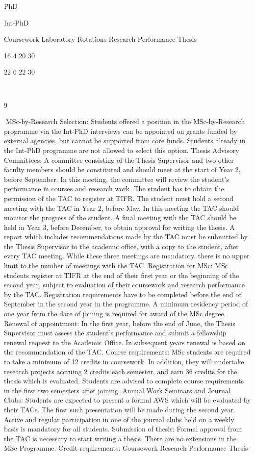 \documentclass[a4paper,10pt]{article}
\begin{document}
PhD

Int-PhD

Coursework
Laboratory Rotations
Research Performance
Thesis

16
4
20
30

22
6
22
30

	
  

9	
  

MSc-by-Research
Selection: Students offered a position in the MSc-by-Research programme via the Int-PhD
interviews can be appointed on grants funded by external agencies, but cannot be supported
from core funds. Students already in the Int-PhD programme are not allowed to select this
option.
Thesis Advisory Committees: A committee consisting of the Thesis Supervisor and two
other faculty members should be constituted and should meet at the start of Year 2, before
September. In this meeting, the committee will review the student’s performance in courses
and research work. The student has to obtain the permission of the TAC to register at TIFR.
The student must hold a second meeting with the TAC in Year 2, before May. In this
meeting the TAC should monitor the progress of the student. A final meeting with the TAC
should be held in Year 3, before December, to obtain approval for writing the thesis. A
report which includes recommendations made by the TAC must be submitted by the Thesis
Supervisor to the academic office, with a copy to the student, after every TAC meeting.
While these three meetings are mandatory, there is no upper limit to the number of meetings
with the TAC.
Registration for MSc: MSc students register at TIFR at the end of their first year or the
beginning of the second year, subject to evaluation of their coursework and research
performance by the TAC. Registration requirements have to be completed before the end of
September in the second year in the programme. A minimum residency period of one year
from the date of joining is required for award of the MSc degree.
Renewal of appointment: In the first year, before the end of June, the Thesis Supervisor
must assess the student’s performance and submit a fellowship renewal request to the
Academic Office. In subsequent years renewal is based on the recommendation of the TAC.
Course requirements: MSc students are required to take a minimum of 12 credits in
coursework. In addition, they will undertake research projects accruing 2 credits each
semester, and earn 36 credits for the thesis which is evaluated. Students are advised to
complete course requirements in the first two semesters after joining.
Annual Work Seminars and Journal Clubs: Students are expected to present a formal
AWS which will be evaluated by their TACs. The first such presentation will be made
during the second year. Active and regular participation in one of the journal clubs held on a
weekly basis is mandatory for all students.
Submission of thesis: Formal approval from the TAC is necessary to start writing a thesis.
There are no extensions in the MSc Programme.
Credit requirements:
Coursework
Research Performance
Thesis
	
\end{document}
